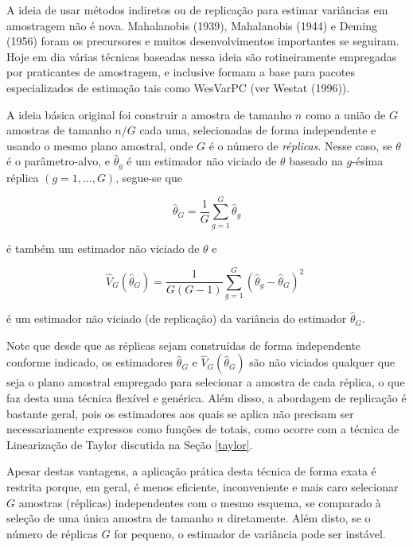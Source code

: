 \documentclass[
  12pt,
  brazilian,
]{book}
\theoremstyle{definition}
\theoremstyle{definition}
\theoremstyle{definition}
\theoremstyle{definition}
\theoremstyle{remark}
\begin{document}
A ideia de usar métodos indiretos ou de replicação para estimar variâncias em amostragem não é nova. Mahalanobis (1939), Mahalanobis (1944) e Deming (1956) foram os precursores e muitos desenvolvimentos importantes se seguiram. Hoje em dia várias técnicas baseadas nessa ideia são rotineiramente empregadas por praticantes de amostragem, e
inclusive formam a base para pacotes especializados de estimação tais como WesVarPC (ver Westat (1996)).

A ideia básica original foi construir a amostra de tamanho \(n\) como a união de \(G\) amostras de tamanho \(n/G\) cada uma, selecionadas de forma independente e usando o mesmo plano amostral, onde \(G\) é o número de \emph{réplicas}. Nesse caso, se \(\theta\) é o parâmetro-alvo, e \(\widehat{\theta}_{g}\) é um estimador não viciado de \(\theta\) baseado na \(g\)-ésima réplica \((g=1,\ldots ,G)\), segue-se que

\[
\widehat{\theta }_{G}=\frac{1}{G}\sum_{g=1}^{G}\widehat{\theta }_{g} 
\]

é também um estimador não viciado de \(\theta\) e

\begin{equation}
\widehat{V}_{G} \left( \widehat{\theta }_{G}\right) = \frac{1}{G \left(
G-1 \right)} \sum_{g=1}^{G} \left( \widehat{\theta }_{g} - \widehat{\theta}_{G} \right)^{2}  \,\, \label{eq:estpa25}
\end{equation}

é um estimador não viciado (de replicação) da variância do estimador \(\widehat{\theta}_{G}\).

Note que desde que as réplicas sejam construídas de forma independente conforme indicado, os estimadores \(\widehat{\theta }_{G}\) e \(\widehat{V}_{G}\left( \widehat{\theta }_{G}\right)\) são não viciados qualquer que seja o plano amostral empregado para selecionar a amostra de cada réplica, o que faz desta uma técnica
flexível e genérica. Além disso, a abordagem de replicação é bastante geral, pois os estimadores aos quais se aplica não precisam ser necessariamente expressos como funções de totais, como ocorre com a técnica de Linearização de Taylor discutida na Seção \ref{taylor}.

Apesar destas vantagens, a aplicação prática desta técnica de forma exata é restrita porque, em geral, é menos eficiente, inconveniente e mais caro selecionar \(G\) amostras (réplicas) independentes com o mesmo esquema, se comparado à seleção de uma única amostra de tamanho \(n\) diretamente. Além disto, se o número de
réplicas \(G\) for pequeno, o estimador de variância pode ser instável.
\end{document}
